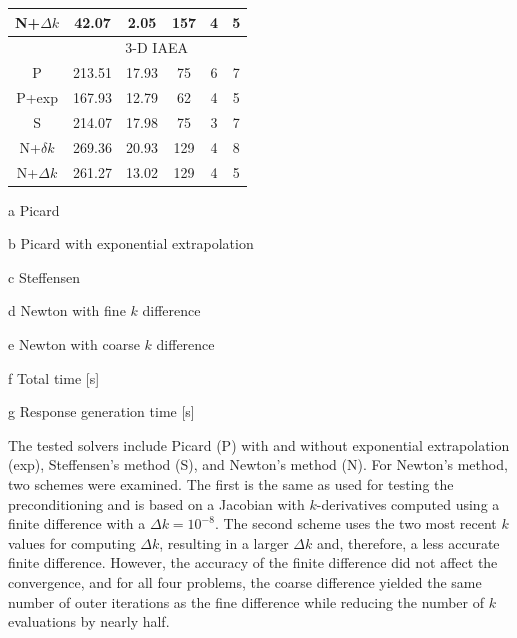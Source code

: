 \begin{table}[ht]
\begin{center}
\begin{threeparttable}
\begin{tabular}{cccccc}
  N+$\Delta k$ &     42.07 &      2.05 &          157 &            4 &            5 \\ 
 \midrule 
 &  \multicolumn{5}{c}{3-D IAEA} \\ 
 \midrule 
        P &    213.51 &     17.93 &           75 &            6 &            7 \\ 
    P+exp &    167.93 &     12.79 &           62 &            4 &            5 \\ 
    S &    214.07 &     17.98 &           75 &            3 &            7 \\ 
  N+$\delta k$ &    269.36 &     20.93 &          129 &            4 &            8 \\ 
  N+$\Delta k$ &    261.27 &     13.02 &          129 &            4 &            5 \\ 
 \bottomrule 
 \end{tabular} 

 {\footnotesize
 \begin{tablenotes}
   \item[a] Picard 
   \item[b] Picard with exponential extrapolation
   \item[c] Steffensen
   \item[d] Newton with fine $k$ difference
   \item[e] Newton with coarse $k$ difference
   \item[f] Total time [s]
   \item[g] Response generation time [s]
 \end{tablenotes}
 }
 \end{threeparttable}
 
 \end{center} 
 
\end{table} 


The tested solvers include Picard (P) with and without exponential 
extrapolation (exp), Steffensen's method (S), and Newton's method (N).
For Newton's method, two schemes were examined.  The first is the same 
as used for testing the preconditioning and is based on a Jacobian with 
$k$-derivatives computed using a finite difference 
with a $\Delta k = 10^{-8}$.
The second scheme uses the two most recent $k$ values
for computing $\Delta k$, resulting in a larger $\Delta k$ and, therefore, 
a less accurate finite difference.  However, the accuracy of the finite 
difference did not affect the convergence, 
and for all four problems,
the coarse difference yielded the same number of outer iterations as the 
fine difference while reducing the number of $k$ evaluations by nearly half.

